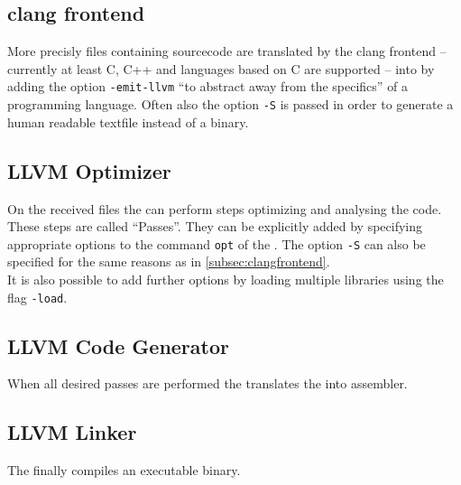 \subsection{clang frontend}\label{subsec:clangfrontend}
More precisly files containing sourcecode are translated by the clang frontend -- currently at least C, C++ and languages based on C are supported -- into \llvmir by adding the option \texttt{-emit-llvm} \enquote{to abstract away from the specifics} \cite{FastScopDetection} of a programming language.
Often also the option \texttt{-S} is passed in order to generate a human readable textfile instead of a \llvmir binary.
\subsection{LLVM Optimizer}\label{subsec:optimizer}
On the received files the \opt can perform steps optimizing and analysing the code.
These steps are called \enquote{Passes}.
They can be explicitly added by specifying appropriate options to the command \texttt{opt} of the \opt.
The option \texttt{-S} can also be specified for the same reasons as in \autoref{subsec:clangfrontend}.\\
It is also possible to add further options by loading multiple libraries using the flag \texttt{-load}.
\subsection{LLVM Code Generator}
When all desired passes are performed the \generator translates the \llvmir into assembler.
\subsection{LLVM Linker}
The \linker finally compiles an executable binary.
